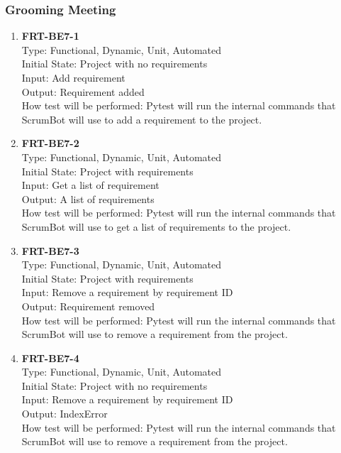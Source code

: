 \documentclass[12pt, titlepage]{article}
\begin{document}
\subsubsection{Grooming Meeting}
\begin{enumerate}
    \item{\textbf{FRT-BE7-1}}\\
    Type: Functional, Dynamic, Unit, Automated\\
    Initial State: Project with no requirements\\
    Input: Add requirement\\
    Output: Requirement added\\
    How test will be performed: Pytest will run the internal commands that ScrumBot will use to add a requirement to the project.
    
    \item{\textbf{FRT-BE7-2}}\\
    Type: Functional, Dynamic, Unit, Automated\\
    Initial State: Project with requirements\\
    Input: Get a list of requirement\\
    Output: A list of requirements\\
    How test will be performed: Pytest will run the internal commands that ScrumBot will use to get a list of requirements to the project.
    
    \item{\textbf{FRT-BE7-3}}\\
    Type: Functional, Dynamic, Unit, Automated\\
    Initial State: Project with requirements\\
    Input: Remove a requirement by requirement ID\\
    Output: Requirement removed\\
    How test will be performed: Pytest will run the internal commands that ScrumBot will use to remove a requirement from the project.
    
    \item{\textbf{FRT-BE7-4}}\\
    Type: Functional, Dynamic, Unit, Automated\\
    Initial State: Project with no requirements\\
    Input: Remove a requirement by requirement ID\\
    Output: IndexError\\
    How test will be performed: Pytest will run the internal commands that ScrumBot will use to remove a requirement from the project.
\end{enumerate}
\end{document}
